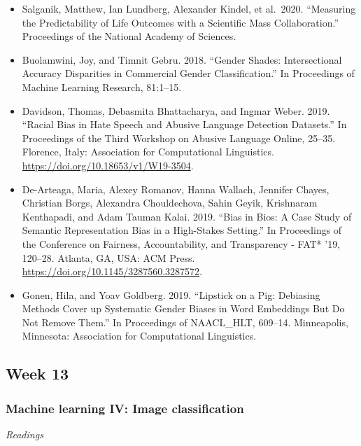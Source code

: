 \documentclass[
  10pt,
]{article}
\providecommand{\tightlist}{%
  \setlength{\itemsep}{0pt}\setlength{\parskip}{0pt}}
\begin{document}
\begin{itemize}
\tightlist
\item
  Salganik, Matthew, Ian Lundberg, Alexander Kindel, et al.~2020.
  ``Measuring the Predictability of Life Outcomes with a Scientiﬁc Mass
  Collaboration.'' Proceedings of the National Academy of Sciences.
\item
  Buolamwini, Joy, and Timnit Gebru. 2018. ``Gender Shades:
  Intersectional Accuracy Disparities in Commercial Gender
  Classiﬁcation.'' In Proceedings of Machine Learning Research,
  81:1--15.
\item
  Davidson, Thomas, Debasmita Bhattacharya, and Ingmar Weber. 2019.
  ``Racial Bias in Hate Speech and Abusive Language Detection
  Datasets.'' In Proceedings of the Third Workshop on Abusive Language
  Online, 25--35. Florence, Italy: Association for Computational
  Linguistics. \url{https://doi.org/10.18653/v1/W19-3504}.
\item
  De-Arteaga, Maria, Alexey Romanov, Hanna Wallach, Jennifer Chayes,
  Christian Borgs, Alexandra Chouldechova, Sahin Geyik, Krishnaram
  Kenthapadi, and Adam Tauman Kalai. 2019. ``Bias in Bios: A Case Study
  of Semantic Representation Bias in a High-Stakes Setting.'' In
  Proceedings of the Conference on Fairness, Accountability, and
  Transparency - FAT* '19, 120--28. Atlanta, GA, USA: ACM Press.
  \url{https://doi.org/10.1145/3287560.3287572}.
\item
  Gonen, Hila, and Yoav Goldberg. 2019. ``Lipstick on a Pig: Debiasing
  Methods Cover up Systematic Gender Biases in Word Embeddings But Do
  Not Remove Them.'' In Proceedings of NAACL\_HLT, 609--14. Minneapolis,
  Minnesota: Association for Computational Linguistics.
\end{itemize}

\hypertarget{week-13}{%
\subsection{Week 13}\label{week-13}}

\hypertarget{machine-learning-iv-image-classification}{%
\subsubsection{Machine learning IV: Image
classification}\label{machine-learning-iv-image-classification}}

\emph{Readings}
\end{document}
